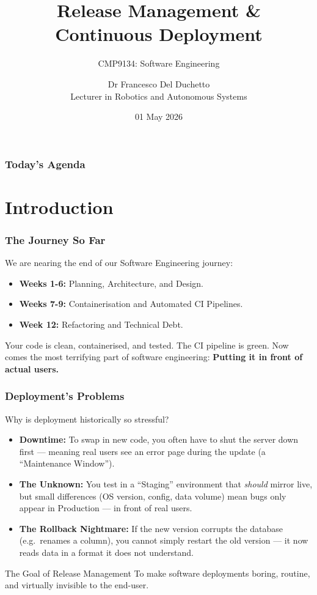 \documentclass[xcolor=table]{beamer}
\title[CMP9134 - Week 13]{Release Management \& Continuous Deployment}
\subtitle{CMP9134: Software Engineering}
\author[Francesco Del Duchetto]{Dr Francesco Del Duchetto\\Lecturer in Robotics and Autonomous Systems}
\institute[University of Lincoln]{University of Lincoln}
\date{01 May 2026}
\begin{document}
\begin{frame}
    \titlepage
\end{frame}

\begin{frame}
    \frametitle{Today's Agenda}
    \tableofcontents
\end{frame}

\section{Introduction}

\begin{frame}
    \frametitle{The Journey So Far}
    We are nearing the end of our Software Engineering journey:
    
    \begin{itemize}
        \item \textbf{Weeks 1-6:} Planning, Architecture, and Design.
        \item \textbf{Weeks 7-9:} Containerisation and Automated CI Pipelines.
        \item \textbf{Week 12:} Refactoring and Technical Debt.
    \end{itemize}
    
    \vspace{0.3cm}
    Your code is clean, containerised, and tested. The CI pipeline is green. Now comes the most terrifying part of software engineering: \textbf{Putting it in front of actual users.}
\end{frame}

\begin{frame}
    \frametitle{Deployment's Problems}
    Why is deployment historically so stressful?
    \small
    \vspace{0.1cm}
    \begin{itemize}
        \item \textbf{Downtime:} To swap in new code, you often have to shut the server down first --- meaning real users see an error page during the update (a ``Maintenance Window'').
        \item \textbf{The Unknown:} You test in a ``Staging'' environment that \textit{should} mirror live, but small differences (OS version, config, data volume) mean bugs only appear in Production --- in front of real users.
        \item \textbf{The Rollback Nightmare:} If the new version corrupts the database (e.g.\ renames a column), you cannot simply restart the old version --- it now reads data in a format it does not understand.
    \end{itemize}
    
    \vspace{0.1cm}
    \begin{block}{The Goal of Release Management}
        To make software deployments boring, routine, and virtually invisible to the end-user.
    \end{block}
\end{frame}
\end{document}
